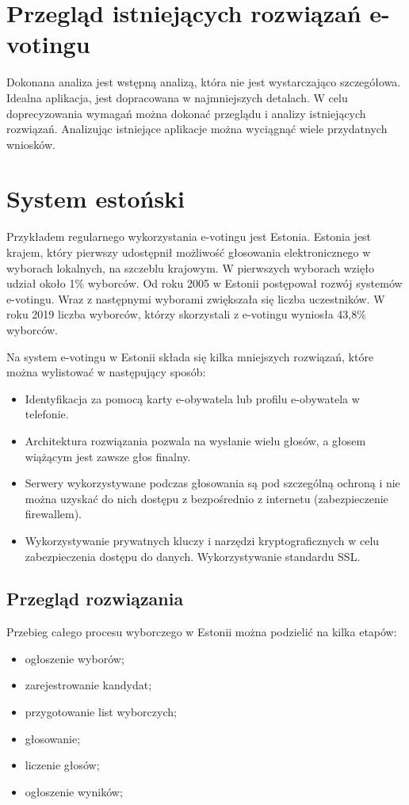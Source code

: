 \documentclass{report}
\begin{document}
\section{Przegląd istniejących rozwiązań e-votingu}
Dokonana analiza jest wstępną analizą, która nie jest wystarczająco szczegółowa. Idealna aplikacja, jest dopracowana w najmniejszych detalach. W celu doprecyzowania wymagań można dokonać przeglądu i analizy istniejących rozwiązań. Analizując istniejące aplikacje można wyciągnąć wiele przydatnych wniosków.
\section{System estoński}
Przykładem regularnego wykorzystania e-votingu jest Estonia. Estonia jest krajem, który pierwszy udostępnił możliwość głosowania elektronicznego w wyborach lokalnych, na szczeblu krajowym. W pierwszych wyborach wzięło udział około 1\% wyborców. Od roku 2005 w Estonii postępował rozwój systemów e-votingu. Wraz z następnymi wyborami zwiększała się liczba uczestników. W roku 2019 liczba wyborców, którzy skorzystali z e-votingu wyniosła 43,8\% wyborców.

Na system e-votingu  w Estonii składa się kilka mniejszych rozwiązań, które można wylistować w następujący sposób:
\begin{itemize}

    \item Identyfikacja za pomocą karty e-obywatela lub profilu e-obywatela w telefonie.

    \item Architektura rozwiązania pozwala na wysłanie wielu głosów, a głosem wiążącym jest zawsze głos finalny.

    \item Serwery wykorzystywane podczas głosowania są pod szczególną ochroną i nie można uzyskać do nich dostępu z bezpośrednio z internetu (zabezpieczenie firewallem).

    \item Wykorzystywanie prywatnych kluczy i narzędzi kryptograficznych w celu zabezpieczenia dostępu do danych. Wykorzystywanie standardu SSL.
    
\end{itemize}

\subsection{Przegląd rozwiązania}
Przebieg całego procesu wyborczego w Estonii można podzielić na kilka etapów:
\begin{itemize}
    \item ogłoszenie wyborów;
    \item zarejestrowanie kandydat;
    \item przygotowanie list wyborczych;
    \item głosowanie;
    \item liczenie głosów;
    \item ogłoszenie wyników;
\end{itemize}
\end{document}
